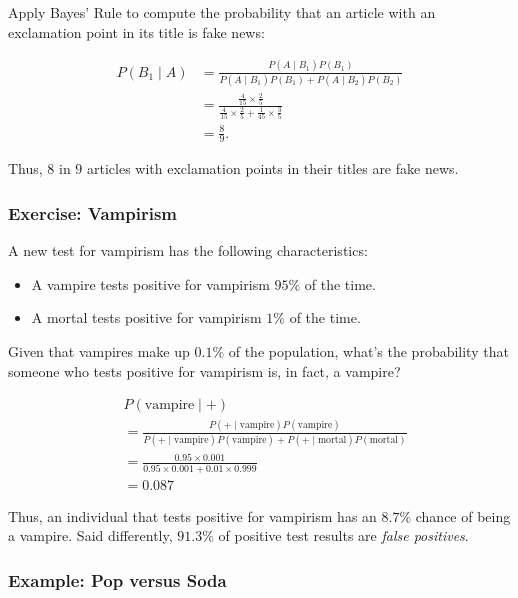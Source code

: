 \documentclass{beamer}
\begin{document}
\begin{frame}
    Apply Bayes' Rule to compute the probability that an
    article with an exclamation point in its title is fake news:
    
    \begin{align*}
    P(B_1\mid A) &= \frac{P(A\mid B_1)P(B_1)}{P(A\mid B_1)P(B_1) + P(A\mid B_2)P(B_2)}\\
    &= \frac{\frac{4}{15}\times \frac{2}{5}}{\frac{4}{15}\times \frac{2}{5} + \frac{1}{45}\times \frac{3}{5}}\\
    &= \frac89.
    \end{align*}

    Thus, $8$ in $9$ articles with exclamation points in their titles are fake news.
\end{frame}


\begin{frame}
    \setlength\parskip{1em}
    \frametitle{Exercise: Vampirism}
    A new test for vampirism has the following characteristics:
    \begin{itemize}
        \setlength\itemsep{1em}
        \item A vampire tests positive for vampirism $95\%$ of the time.
        \item A mortal tests positive for vampirism $1\%$ of the time.
    \end{itemize}
    Given that vampires make up $0.1\%$ of the population, what's the probability that someone who tests positive for vampirism is, in fact, a vampire?
\end{frame}


\begin{frame}    
    \begin{align*}
    &P(\text{vampire}\mid+)\\
    &=\frac{P(+\mid\text{vampire})P(\text{vampire})}
    {P(+\mid\text{vampire})P(\text{vampire}) + P(+\mid\text{mortal})P(\text{mortal})}\\
    &= \frac{0.95\times 0.001}{0.95\times 0.001 + 0.01\times 0.999}\\
    &= 0.087
    \end{align*}

    Thus, an individual that tests positive for vampirism has an $8.7\%$ chance of being a vampire.
    Said differently, $91.3\%$ of positive test results are \emph{false positives}.
\end{frame}

\begin{frame}
    \frametitle{Example: Pop versus Soda}
\end{frame}
\end{document}
